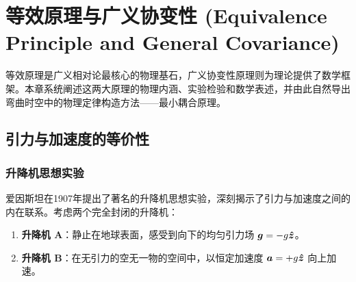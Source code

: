 \chapter{等效原理与广义协变性 (Equivalence Principle and General Covariance)}
\label{chap:equivalence}

等效原理是广义相对论最核心的物理基石，广义协变性原理则为理论提供了数学框架。本章系统阐述这两大原理的物理内涵、实验检验和数学表述，并由此自然导出弯曲时空中的物理定律构造方法——最小耦合原理。

\section{引力与加速度的等价性}

\subsection{升降机思想实验}

爱因斯坦在1907年提出了著名的升降机思想实验，深刻揭示了引力与加速度之间的内在联系。考虑两个完全封闭的升降机：

\begin{enumerate}
    \item \textbf{升降机 A}：静止在地球表面，感受到向下的均匀引力场 $\vb*{g} = -g \vu*{z}$。
    \item \textbf{升降机 B}：在无引力的空无一物的空间中，以恒定加速度 $\vb*{a} = +g \vu*{z}$ 向上加速。
\end{enumerate}

